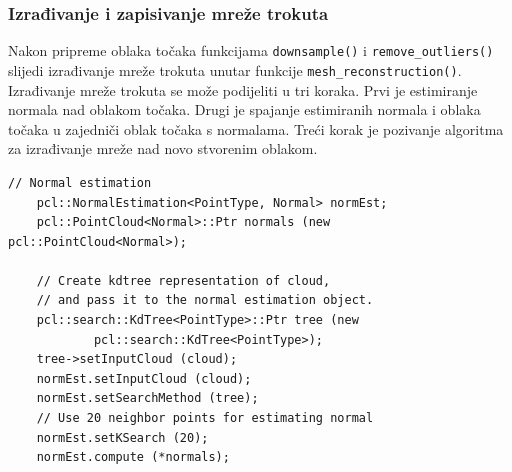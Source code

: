 
\subsubsection{Izrađivanje i zapisivanje mreže trokuta} %
\label{ssub:Izradivanje i zapisivanje mreže trokuta}

Nakon pripreme oblaka točaka funkcijama \texttt{downsample()} i
\texttt{remove\_outliers()} slijedi izrađivanje mreže trokuta unutar
funkcije \texttt{mesh\_reconstruction()}. Izrađivanje mreže trokuta se
može podijeliti u tri koraka. Prvi je estimiranje normala nad oblakom
točaka. Drugi je spajanje estimiranih normala i oblaka točaka u
zajedniči oblak točaka s normalama. Treći korak je pozivanje algoritma
za izrađivanje mreže nad novo stvorenim oblakom.

\begin{lstlisting}[label=lstIzradivanje1, caption={Dio izvornog koda iz
funkcije \texttt{reconstruct\_mesh()} }]
    // Normal estimation
    pcl::NormalEstimation<PointType, Normal> normEst;
    pcl::PointCloud<Normal>::Ptr normals (new pcl::PointCloud<Normal>);
    
    // Create kdtree representation of cloud, 
    // and pass it to the normal estimation object. 
    pcl::search::KdTree<PointType>::Ptr tree (new
            pcl::search::KdTree<PointType>);
    tree->setInputCloud (cloud);
    normEst.setInputCloud (cloud);
    normEst.setSearchMethod (tree);
    // Use 20 neighbor points for estimating normal
    normEst.setKSearch (20);
    normEst.compute (*normals);
\end{lstlisting}

